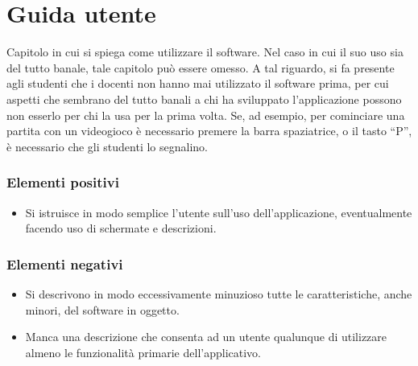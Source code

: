 \documentclass[a4paper,12pt]{report}
\begin{document}
\appendix
\chapter{Guida utente}

Capitolo in cui si spiega come utilizzare il software. Nel caso in cui il suo uso sia del tutto 
banale, tale capitolo può essere omesso.
%
A tal riguardo, si fa presente agli studenti che i docenti non hanno mai utilizzato il software 
prima, per cui aspetti che sembrano del tutto banali a chi ha sviluppato l'applicazione possono non 
esserlo per chi la usa per la prima volta.
%
Se, ad esempio, per cominciare una partita con un videogioco è necessario premere la barra 
spaziatrice, o il tasto ``P'', è necessario che gli studenti lo segnalino.

\subsection*{Elementi positivi}

\begin{itemize}
 \item Si istruisce in modo semplice l'utente sull'uso dell'applicazione, eventualmente facendo uso di schermate e descrizioni.
\end{itemize}

\subsection*{Elementi negativi}
\begin{itemize}
 \item Si descrivono in modo eccessivamente minuzioso tutte le caratteristiche, anche minori, del software in oggetto.
 \item Manca una descrizione che consenta ad un utente qualunque di utilizzare almeno le funzionalità primarie dell'applicativo.
\end{itemize}



\end{document}

